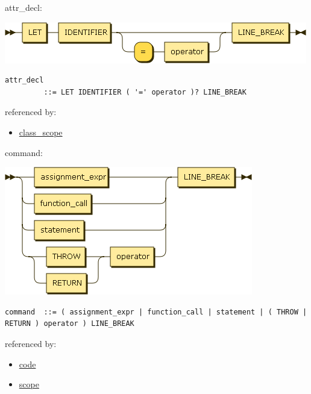 \begin{minipage}{\textwidth}
\protect\hypertarget{attr_decl}{}{attr\_decl:}

\includegraphics[width=5.20833in,height=0.70833in]{diagram/attr_decl.png}

\begin{verbatim}
attr_decl
         ::= LET IDENTIFIER ( '=' operator )? LINE_BREAK
\end{verbatim}

referenced by:

\begin{itemize}
\tightlist
\item
  \protect\hyperlink{class_scope}{class\_scope}
\end{itemize}

\end{minipage}

\begin{minipage}{\textwidth}
\protect\hypertarget{command}{}{command:}

\includegraphics[width=4.27083in,height=2.20833in]{diagram/command.png}

\begin{verbatim}
command  ::= ( assignment_expr | function_call | statement | ( THROW | RETURN ) operator ) LINE_BREAK
\end{verbatim}

referenced by:

\begin{itemize}
\tightlist
\item
  \protect\hyperlink{code}{code}
\item
  \protect\hyperlink{scope}{scope}
\end{itemize}

\end{minipage}

